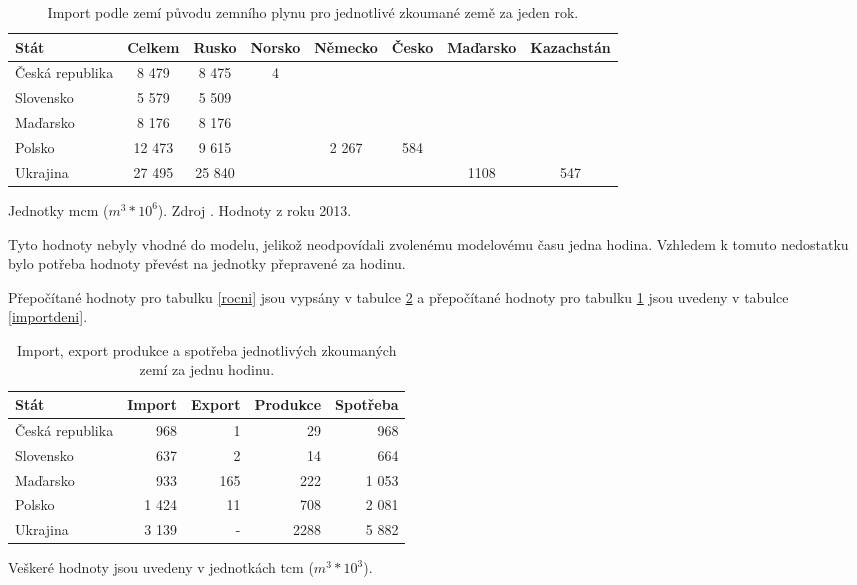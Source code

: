 \documentclass[a4paper,11pt]{article}
\begin{document}
\begin{table}[h!]
\begin{center}
\begin{tabular}{|l|c|c|c|c|c|c|c|}
    \hline
    Stát 			& Celkem		& Rusko & Norsko & Německo 	& Česko & Maďarsko & Kazachstán\\
    \hline 
    Česká republika	& 8 479		& 8 475	& 4		& 		&			&		&\\ 
    Slovensko 		& 5 579		& 5 509	& 		& 		&			&		&\\
    Maďarsko 		& 8 176		& 8 176 &		&		&			&		&\\
    Polsko 			& 12 473 	& 9 615 	& 		& 2 267	& 584		&		&\\
    Ukrajina 		& 27 495		& 25 840	& 		&		&			& 1108	& 547\\ \hline
\end{tabular}
\caption{Import podle zemí původu  zemního plynu pro jednotlivé zkoumané země za jeden rok.}
Jednotky mcm ($m^3 * 10^6$).  Zdroj \cite{IEA}. Hodnoty z roku 2013.
\label{importrocni}
\end{center}
\end{table}


\newpage

Tyto hodnoty nebyly vhodné do modelu, jelikož neodpovídali
zvolenému modelovému času jedna hodina. 
Vzhledem k tomuto nedostatku bylo potřeba hodnoty převést na jednotky přepravené za hodinu.

Přepočítané hodnoty pro tabulku \ref{rocni} jsou vypsány v tabulce \ref{denni}
a přepočítané hodnoty pro tabulku \ref{importrocni} jsou uvedeny v tabulce \ref{importdeni}. 

\begin{table}[h!]
\begin{center}
\begin{tabular}{|l|r|r|r|r|}
    \hline
    Stát 			& Import 	& Export & Produkce & Spotřeba \\
    \hline 
    Česká republika	& 968 		& 1 		& 29		& 968\\ 
    Slovensko 		& 637		& 2		& 14		& 664\\
    Maďarsko 		& 933		& 165	& 222	& 1 053\\
    Polsko 			& 1 424		& 11		& 708	& 2 081\\
    Ukrajina 		& 3 139	 	& -		& 2288	& 5 882 \\ \hline
\end{tabular}
\caption{Import, export produkce a spotřeba jednotlivých zkoumaných zemí za jednu hodinu.}
Veškeré hodnoty jsou uvedeny v jednotkách tcm ($m^3 * 10^3$)\footnotemark.
\label{denni}
\end{center}
\end{table}
\end{document}
